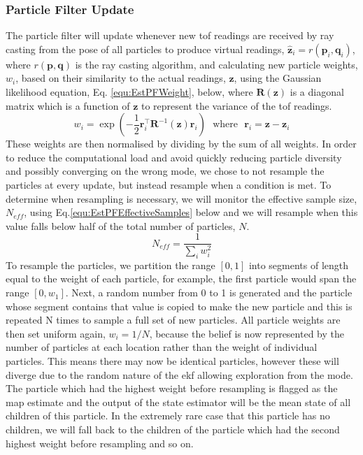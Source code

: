 \documentclass{report_template_oxford}
\begin{document}
\subsubsection{Particle Filter Update} 
The particle filter will update whenever new \gls{tof} readings are received by ray casting from the pose of all particles to produce virtual readings, $\hat{\mathbf{z}}_i = r(\mathbf{p}_i,\mathbf{q}_i)$, where $r(\mathbf{p},\mathbf{q})$ is the ray casting algorithm, and calculating new particle weights, $w_i$, based on their similarity to the actual readings, $\mathbf{z}$, using the Gaussian likelihood equation, Eq. \ref{equ:EstPFWeight}, below, where $\mathbf{R}(\mathbf{z})$ is a diagonal matrix which is a function of $\mathbf{z}$ to represent the variance of the \gls{tof} readings.
\begin{equation}\label{equ:EstPFWeight}
    w_i = \exp(-\frac{1}{2}\mathbf{r}_i^\top \mathbf{R}^{-1}(\mathbf{z}) \mathbf{r}_i) \mathrm{\ \ \ where \  \ \ } \mathbf{r}_i = \mathbf{z} - \mathbf{z}_i
\end{equation}
These weights are then normalised by dividing by the sum of all weights.
In order to reduce the computational load and avoid quickly reducing particle diversity and possibly converging on the wrong mode, we chose to not resample the particles at every update, but instead resample when a condition is met. To determine when resampling is necessary, we will monitor the effective sample size, $N_{eff}$, using Eq.\ref{equ:EstPFEffectiveSamples} below and we will resample when this value falls below half of the total number of particles, $N$.
\begin{equation}\label{equ:EstPFEffectiveSamples}
    N_{eff} = \frac{1}{\sum_i w_i^2}
\end{equation}
To resample the particles, we partition the range $[0,1]$ into segments of length equal to the weight of each particle, for example, the first particle would span the range $[0,w_1]$. Next, a random number from 0 to 1 is generated and the particle whose segment contains that value is copied to make the new particle and this is repeated N times to sample a full set of new particles. All particle weights are then set uniform again, $w_i = 1/N$, because the belief is now represented by the number of particles at each location rather than the weight of individual particles. This means there may now be identical particles, however these will diverge due to the random nature of the \gls{ekf} allowing exploration from the mode. The particle which had the highest weight before resampling is flagged as the \gls{map} estimate and the output of the state estimator will be the mean state of all children of this particle. In the extremely rare case that this particle has no children, we will fall back to the children of the particle which had the second highest weight before resampling and so on.
\end{document}
